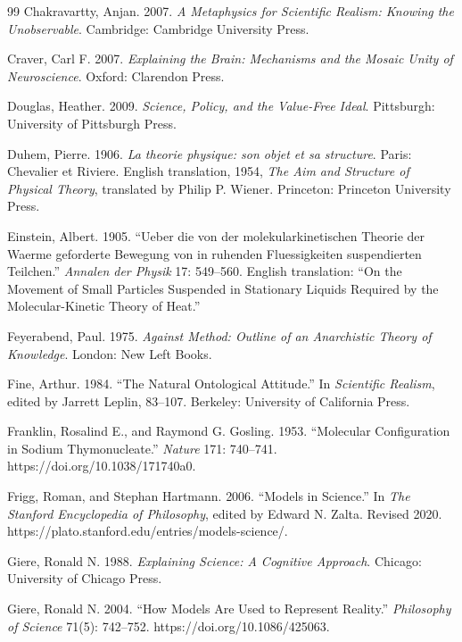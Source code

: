 \begin{thebibliography}{99}
Chakravartty, Anjan. 2007. \emph{A Metaphysics for Scientific Realism: Knowing the Unobservable}. Cambridge: Cambridge University Press.

Craver, Carl F. 2007. \emph{Explaining the Brain: Mechanisms and the Mosaic Unity of Neuroscience}. Oxford: Clarendon Press.

Douglas, Heather. 2009. \emph{Science, Policy, and the Value-Free Ideal}. Pittsburgh: University of Pittsburgh Press.

Duhem, Pierre. 1906. \emph{La theorie physique: son objet et sa structure}. Paris: Chevalier et Riviere. English translation, 1954, \emph{The Aim and Structure of Physical Theory}, translated by Philip P. Wiener. Princeton: Princeton University Press.

Einstein, Albert. 1905. \enquote{Ueber die von der molekularkinetischen Theorie der Waerme geforderte Bewegung von in ruhenden Fluessigkeiten suspendierten Teilchen.} \emph{Annalen der Physik} 17: 549--560. English translation: \enquote{On the Movement of Small Particles Suspended in Stationary Liquids Required by the Molecular-Kinetic Theory of Heat.}

Feyerabend, Paul. 1975. \emph{Against Method: Outline of an Anarchistic Theory of Knowledge}. London: New Left Books.

Fine, Arthur. 1984. \enquote{The Natural Ontological Attitude.} In \emph{Scientific Realism}, edited by Jarrett Leplin, 83--107. Berkeley: University of California Press.

Franklin, Rosalind E., and Raymond G. Gosling. 1953. \enquote{Molecular Configuration in Sodium Thymonucleate.} \emph{Nature} 171: 740--741. https://doi.org/10.1038/171740a0.

Frigg, Roman, and Stephan Hartmann. 2006. \enquote{Models in Science.} In \emph{The Stanford Encyclopedia of Philosophy}, edited by Edward N. Zalta. Revised 2020. https://plato.stanford.edu/entries/models-science/.

Giere, Ronald N. 1988. \emph{Explaining Science: A Cognitive Approach}. Chicago: University of Chicago Press.

Giere, Ronald N. 2004. \enquote{How Models Are Used to Represent Reality.} \emph{Philosophy of Science} 71(5): 742--752. https://doi.org/10.1086/425063.


\end{thebibliography}
